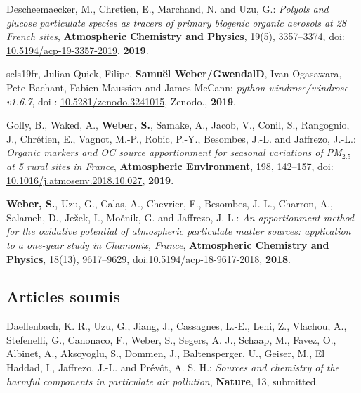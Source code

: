 \begin{etaremune}
        Descheemaecker, M., Chretien, E., Marchand, N. and Uzu, G.:
        \textit{Polyols and glucose particulate species as tracers of primary biogenic
        organic aerosols at 28 French sites},
        \textbf{Atmospheric Chemistry and Physics}, 19(5), 3357–3374,
        doi: \href{https://doi.org/10.5194/acp-19-3357-2019}{10.5194/acp-19-3357-2019},
        \textbf{2019}.
    \item scls19fr, Julian Quick, Filipe, \textbf{Samuël Weber/GwendalD}, Ivan Ogasawara, Pete
        Bachant, Fabien Maussion and James McCann: \textit{python-windrose/windrose
        v1.6.7},
        doi : \href{https://doi.org/10.5281/zenodo.3241015}{10.5281/zenodo.3241015}, 
        Zenodo., \textbf{2019}.
    \item Golly, B., Waked, A., \textbf{Weber, S.}, Samake, A., Jacob, V., Conil, S.,
        Rangognio, J., Chrétien, E., Vagnot, M.-P., Robic, P.-Y., Besombes, J.-L. and
        Jaffrezo, J.-L.:
        \textit{Organic markers and OC source apportionment for seasonal variations of
        PM$_{2.5}$ at 5 rural sites in France}, \textbf{Atmospheric Environment}, 198, 142–157,
        doi: \href{https://doi.org/10.1016/j.atmosenv.2018.10.027}{10.1016/j.atmosenv.2018.10.027},
        \textbf{2019}.
    \item \textbf{Weber, S.}, Uzu, G., Calas, A., Chevrier, F., Besombes, J.-L., Charron, A., Salameh, D., Ježek, I.,
        Močnik, G. and Jaffrezo, J.-L.:
        \textit{An apportionment method for the oxidative potential of atmospheric
        particulate matter sources: application to a one-year study in Chamonix, France}, 
        \textbf{Atmospheric Chemistry and Physics}, 18(13), 9617–9629, doi:10.5194/acp-18-9617-2018, \textbf{2018}.
\end{etaremune}

\subsection{Articles soumis}

\begin{etaremune}
    \item  Daellenbach, K. R., Uzu, G., Jiang, J., Cassagnes, L.-E., Leni, Z., Vlachou,
        A., Stefenelli, G., Canonaco, F., Weber, S., Segers, A. J., Schaap, M., Favez, O.,
        Albinet, A., Aksoyoglu, S., Dommen, J., Baltensperger, U., Geiser, M., El Haddad,
        I., Jaffrezo, J.-L. and Prévôt, A. S. H.: 
        \textit{Sources and chemistry of the harmful components in particulate air
        pollution}, \textbf{Nature}, 13, submitted.
\end{etaremune}


